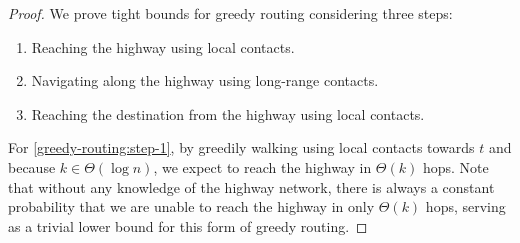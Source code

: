 \begin{proof}
    We prove tight bounds for greedy routing considering three steps:
    \begin{enumerate}
        \item Reaching the highway using local contacts. \label{greedy-routing:step-1}

        \item Navigating along the highway using long-range contacts. \label{greedy-routing:step-2}
        
        \item Reaching the destination from the highway using local contacts. \label{greedy-routing:step-3}
    \end{enumerate}
    For \cref{greedy-routing:step-1}, by greedily walking using local contacts
    towards $t$ and because $k \in \Theta(\log n)$, we expect to 
    reach the highway in $\Theta(k)$ hops.
    Note that without any knowledge of the highway network, there is always a
    constant probability that we are unable to reach the highway in only $\Theta(k)$
    hops, serving as a trivial lower bound for this form of greedy routing.


\end{proof}
